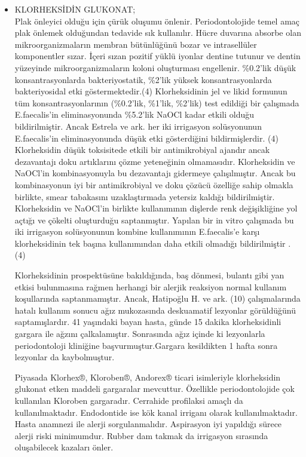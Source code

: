 \begin{itemize}
   
   
   \item KLORHEKSİDİN GLUKONAT; \\
   Plak önleyici olduğu için çürük oluşumu önlenir. Periodontolojide temel amaç plak önlemek olduğundan tedavide sık kullanılır.
Hücre duvarına absorbe olan mikroorganizmaların membran bütünlüğünü bozar ve intrasellüler komponentler sızar. İçeri sızan pozitif yüklü iyonlar dentine tutunur ve dentin yüzeyinde mikroorganizmaların koloni oluşturması engellenir.
\%0.2’lik düşük konsantrasyonlarda bakteriyostatik, \%2’lik yüksek konsantrasyonlarda bakteriyosidal etki göstermektedir.(4) Klorheksidinin jel ve likid formunun tüm konsantrasyonlarının (\%0.2’lik, \%1’lik, \%2’lik) test edildiği bir çalışmada E.faecalis’in eliminasyonunda \%5.2’lik NaOCl kadar etkili olduğu bildirilmiştir. Ancak Estrela ve ark. her iki irrigasyon solüsyonunun E.faecalis’in eliminasyonunda düşük etki gösterdiğini bildirmişlerdir. (4)
Klorheksidin düşük toksisitede etkili bir antimikrobiyal ajandır ancak dezavantajı doku artıklarını çözme yeteneğinin olmamasıdır. Klorheksidin ve NaOCl’in kombinasyonuyla bu dezavantajı gidermeye çalışılmıştır. Ancak bu kombinasyonun iyi bir antimikrobiyal ve doku çözücü özelliğe sahip olmakla birlikte, smear tabakasını uzaklaştırmada yetersiz kaldığı bildirilmiştir. Klorheksidin ve NaOCl’in birlikte kullanımının dişlerde renk değişikliğine yol açtığı ve çökelti oluşturduğu saptanmıştır. Yapılan bir in vitro çalışmada bu iki irrigasyon solüsyonunun kombine kullanımının E.faecalis’e karşı klorheksidinin tek başına kullanımından daha etkili olmadığı bildirilmiştir . (4)

Klorheksidinin prospektüsüne bakıldığında, baş dönmesi, bulantı gibi yan etkisi bulunmasına rağmen herhangi bir alerjik reaksiyon normal kullanım koşullarında saptanmamıştır. Ancak, Hatipoğlu H. ve ark. (10) çalışmalarında hatalı kullanım sonucu ağız mukozasında deskuamatif lezyonlar görüldüğünü saptamışlardır. 41 yaşındaki bayan hasta, günde 15 dakika klorheksidinli gargara ile ağzını çalkalamıştır. Sonrasında ağız içinde ki lezyonlarla periodontoloji kliniğine başvurmuştur.Gargara kesildikten 1 hafta sonra lezyonlar da kaybolmuştur.

       

Piyasada Klorhex®, Kloroben®, Andorex® ticari isimleriyle klorheksidin glukonat etken maddeli gargaralar mevcuttur.  Özellikle periodontolojide çok kullanılan Kloroben gargaradır. Cerrahide profilaksi amaçlı da kullanılmaktadır.  Endodontide ise kök kanal irriganı olarak kullanılmaktadır.
Hasta anamnezi ile alerji sorgulanmalıdır. Aspirasyon iyi yapıldığı sürece alerji riski minimumdur.
Rubber dam takmak da irrigasyon sırasında oluşabilecek kazaları önler.


\end{itemize}
